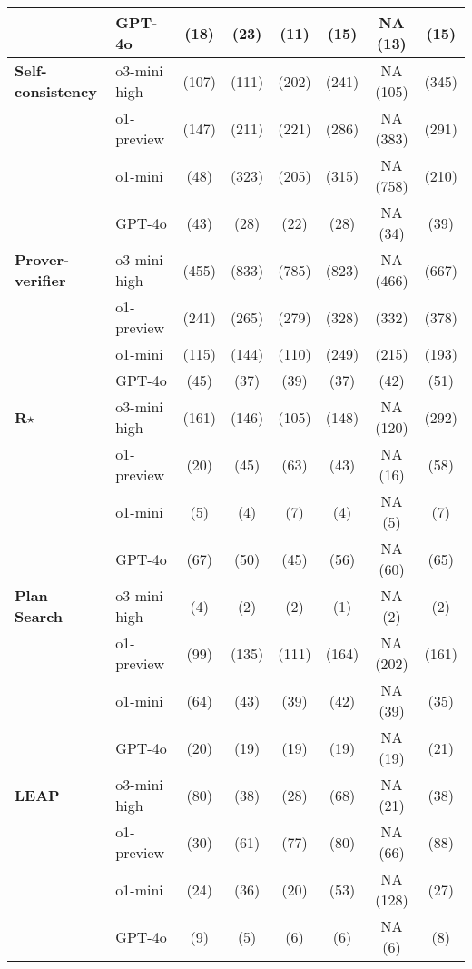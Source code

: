 \begin{table}[H]
\begin{tabular}{llcccccc}
& GPT-4o & \C (18) & \X (23) & \X (11) & \X (15) & NA (13) & \X (15) \\
\midrule
\textbf{Self-consistency} 
& o3-mini high & \C (107) & \X (111) & \C (202) & \X (241) & NA (105) & \X (345) \\
& o1-preview & \C (147) & \X (211) & \X (221) & \X (286) & NA (383) & \X (291) \\
& o1-mini & \C (48) & \X (323) & \X (205) & \X (315) & NA (758) & \X (210) \\
& GPT-4o & \C (43) & \X (28) & \X (22) & \X (28) & NA (34) & \X (39) \\
\midrule
\textbf{Prover-verifier} 
& o3-mini high & \C (455) & \X (833) & \X (785) & \X (823) & NA (466) & \X (667) \\
& o1-preview & \C (241) & \X (265) & \X (279) & \C (328) & \X (332) & \X(378) \\
& o1-mini & \C (115) & \X(144) & \X (110) & \X (249) & \X (215) & \X (193) \\
& GPT-4o & \C (45) & \X (37) & \X (39) & \X (37) & \X (42) & \X (51) \\
\midrule
\textbf{R$\star$} & o3-mini high & \X (161) & \X (146) & \X (105) & \X (148) & NA (120) & (292) \\
& o1-preview & \X (20) & \X (45) & \X (63) & \X (43) & NA (16) & \X (58) \\
& o1-mini & \X (5) & \X(4) & \X (7) & \X (4) & NA (5) & \X (7) \\
& GPT-4o & \X (67) & \X (50) & \X (45) & \X (56) & NA (60) & \X (65) \\
\midrule
\textbf{Plan Search} & o3-mini high & \F (4) & \F (2) & \F (2) & \F (1) & NA (2) & \F (2) \\
& o1-preview & \X (99) & \X (135) & \X (111) & \X (164) & NA (202) & \X (161) \\
& o1-mini & \X (64) & \X (43) & \X (39) & \X (42) & NA (39) & \X (35) \\
& GPT-4o & \X (20) &\X (19) & \X (19) & \X (19) & NA (19) & \X (21) \\
\midrule
\textbf{LEAP} 
& o3-mini high & \C (80) & \X (38) & \X (28) & \X (68) & NA (21) & \X (38) \\
& o1-preview & \C (30) & \X (61) & \X (77) & \X (80) & NA (66) & \X (88) \\
& o1-mini & \C (24) & \X (36) & \X (20) & \X (53) & NA (128) & \X(27) \\
& GPT-4o & \C (9) & \X (5) & \X (6) & \X (6) & NA (6) & \X (8) \\
\bottomrule
\end{tabular}
\label{tab:USAMO2024_method_model_answer_matrix}
\end{table}
